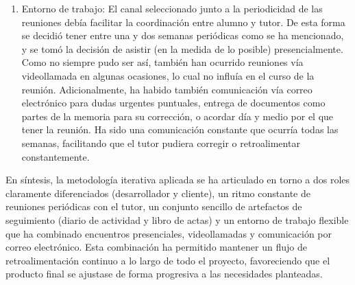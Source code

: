 \begin{enumerate}
	\item Entorno de trabajo: El canal seleccionado junto a la periodicidad de las reuniones debía facilitar la coordinación entre alumno y tutor. De esta forma se decidió tener entre una y dos semanas periódicas como se ha mencionado, y se tomó la decisión de asistir (en la medida de lo posible) presencialmente. Como no siempre pudo ser así, también han ocurrido reuniones vía videollamada en algunas ocasiones, lo cual no influía en el curso de la reunión. Adicionalmente, ha habido también comunicación vía correo electrónico para dudas urgentes puntuales, entrega de documentos como partes de la memoria para su corrección, o acordar día y medio por el que tener la reunión. Ha sido una comunicación constante que ocurría todas las semanas, facilitando que el tutor pudiera corregir o retroalimentar constantemente.
\end{enumerate}
En síntesis, la metodología iterativa aplicada se ha articulado en torno a dos roles claramente diferenciados (desarrollador y cliente), un ritmo constante de reuniones periódicas con el tutor, un conjunto sencillo de artefactos de seguimiento (diario de actividad y libro de actas) y un entorno de trabajo flexible que ha combinado encuentros presenciales, videollamadas y comunicación por correo electrónico. Esta combinación ha permitido mantener un flujo de retroalimentación continuo a lo largo de todo el proyecto, favoreciendo que el producto final se ajustase de forma progresiva a las necesidades planteadas.

